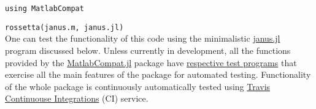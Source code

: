 \verb|using MatlabCompat|

\verb|rossetta(janus.m, janus.jl)|\\

One can test the functionality of this code using the minimalistic \href{https://github.com/MatlabCompat/MatlabCompat.jl/blob/master/test/janus.jl}{janus.jl} program discussed below. Unless currently in development, all the functions provided by the \href{https://github.com/MatlabCompat/MatlabCompat.jl}{MatlabCompat.jl} package have \href{https://github.com/MatlabCompat/MatlabCompat.jl/tree/master/test}{respective test programs} that exercise all the main features of the package for automated testing. Functionality of the whole package is continuously automatically tested using \href{https://travis-ci.org/MatlabCompat/MatlabCompat.jl}{Travis Continuouse Integrations} (CI) service.
  
  
  